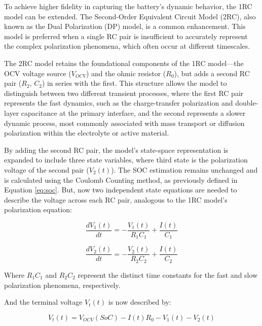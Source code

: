 \documentclass[lettersize,journal]{IEEEtran}
\begin{document}
To achieve higher fidelity in capturing the battery's dynamic behavior, the 1RC model can be extended. The Second-Order Equivalent Circuit Model (2RC), also known as the Dual Polarization (DP) model, is a common enhancement\cite{tekin2024comparative, khalfi2021electric}. This model is preferred when a single RC pair is insufficient to accurately represent the complex polarization phenomena, which often occur at different timescales.

The 2RC model retains the foundational components of the 1RC model—the OCV voltage source ($V_{OCV}$) and the ohmic resistor ($R_0$), but adds a second RC pair ($R_2$, $C_2$) in series with the first. This structure allows the model to distinguish between two different transient processes\cite{tran2021comprehensive}, where the first RC pair represents the fast dynamics, such as the charge-transfer polarization and double-layer capacitance at the primary interface, and the second represents a slower dynamic process, most commonly associated with mass transport or diffusion polarization within the electrolyte or active material.

By adding the second RC pair, the model's state-space representation is expanded to include three state variables, where third state is the polarization voltage of the second pair ($V_2(t)$). The SOC estimation remains unchanged and is calculated using the Coulomb Counting method, as previously defined in Equation \ref{eq:soc}. But, now two independent state equations are needed to describe the voltage across each RC pair, analogous to the 1RC model's polarization equation:

\begin{equation}
	\label{eq:v1_2rc}
	\frac{dV_1(t)}{dt} = - \frac{V_1(t)}{R_1 C_1} + \frac{I(t)}{C_1}
\end{equation}

\begin{equation}
	\label{eq:v2_2rc}
	\frac{dV_2(t)}{dt} = - \frac{V_2(t)}{R_2 C_2} + \frac{I(t)}{C_2}
\end{equation}

Where $R_1 C_1$ and $R_2 C_2$ represent the distinct time constants for the fast and slow polarization phenomena, respectively.

And the terminal voltage $V_t(t)$ is now described by:

\begin{equation}
	\label{eq:vt_2rc}
	V_t(t) = V_{OCV}(SoC) - I(t)R_0 - V_1(t) - V_2(t)
\end{equation}
\end{document}

